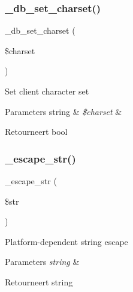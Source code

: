 \subsubsection{\texorpdfstring{\_db\_set\_charset()}{\_db\_set\_charset()}}
{\footnotesize\ttfamily \+\_\+db\+\_\+set\+\_\+charset (\begin{DoxyParamCaption}\item[{}]{\$charset }\end{DoxyParamCaption})\hspace{0.3cm}{\ttfamily [protected]}}

Set client character set


\begin{DoxyParams}[1]{Parameters}
string & {\em \$charset} & \\
\hline
\end{DoxyParams}
\begin{DoxyReturn}{Retourneert}
bool 
\end{DoxyReturn}
\mbox{\label{class_c_i___d_b__mysql__driver_af8ef0237bfcdb19215b63fff769e7a55}} 
\subsubsection{\texorpdfstring{\_escape\_str()}{\_escape\_str()}}
{\footnotesize\ttfamily \+\_\+escape\+\_\+str (\begin{DoxyParamCaption}\item[{}]{\$str }\end{DoxyParamCaption})\hspace{0.3cm}{\ttfamily [protected]}}

Platform-\/dependent string escape


\begin{DoxyParams}{Parameters}
{\em string} & \\
\hline
\end{DoxyParams}
\begin{DoxyReturn}{Retourneert}
string 
\end{DoxyReturn}
\mbox{\label{class_c_i___d_b__mysql__driver_a114ab675d89bf8324a41785fb475e86d}} 
